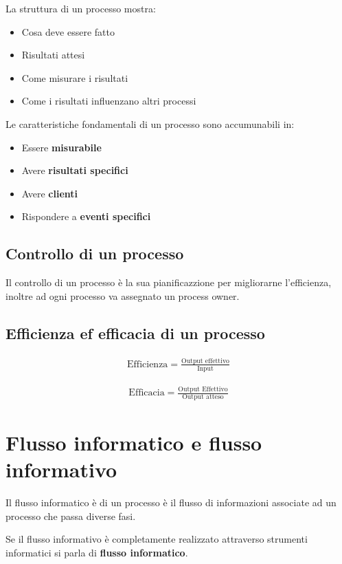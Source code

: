 La struttura di un processo mostra:
\begin{itemize}
  \item Cosa deve essere fatto
  \item Risultati attesi
  \item Come misurare i risultati
  \item Come i risultati influenzano altri processi
\end{itemize}

Le caratteristiche fondamentali di un processo sono accumunabili in:
\begin{itemize}
  \item Essere \textbf{misurabile}
  \item Avere \textbf{risultati specifici}
  \item Avere \textbf{clienti}
  \item Rispondere a \textbf{eventi specifici}
\end{itemize}


\subsection{Controllo di un processo}
Il controllo di un processo è la sua pianificazzione per migliorarne l'efficienza,
inoltre ad ogni processo va assegnato un process owner.


\subsection{Efficienza ef efficacia di un processo}


\begin{align}
  \text{Efficienza} = \frac{\text{Output effettivo}}{\text{Input}}
\end{align}

\begin{align}
  \text{Efficacia} = \frac{\text{Output Effettivo}}{\text{Output atteso}}
\end{align}

\section{Flusso informatico e flusso informativo}

Il flusso informatico è di un processo è il flusso di informazioni associate ad un processo che passa diverse fasi.

Se il flusso informativo è completamente realizzato attraverso strumenti informatici si parla di \textbf{flusso informatico}.
